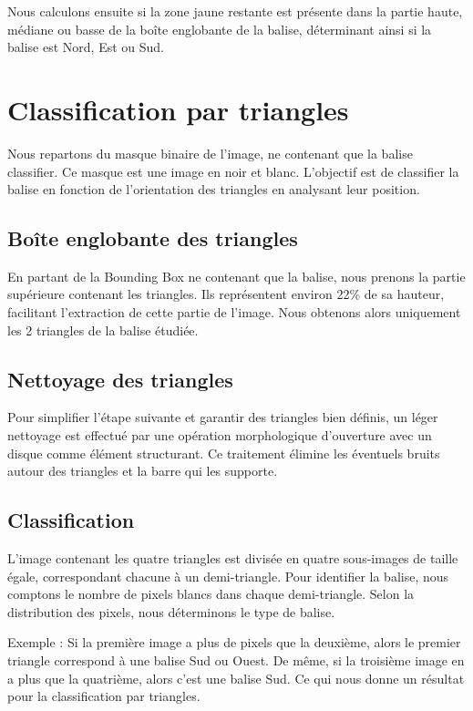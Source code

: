 \documentclass{article}
\begin{document}
Nous calculons ensuite si la zone jaune restante est présente dans la partie
haute, médiane ou basse de la boîte englobante de la balise, déterminant ainsi
si la balise est Nord, Est ou Sud.

\section{Classification par triangles}

Nous repartons du masque binaire de l’image, ne contenant que la balise
classifier. Ce masque est une image en noir et blanc. L’objectif est de
classifier la balise en fonction de l’orientation des triangles en analysant
leur position.

\subsection{Boîte englobante des triangles}

En partant de la Bounding Box ne contenant que la balise, nous prenons la
partie supérieure contenant les triangles. Ils représentent environ 22\% de sa
hauteur, facilitant l’extraction de cette partie de l’image. Nous obtenons
alors uniquement les 2 triangles de la balise étudiée.

\subsection{Nettoyage des triangles}

Pour simplifier l’étape suivante et garantir des triangles bien définis, un
léger nettoyage est effectué par une opération morphologique d’ouverture avec
un disque comme élément structurant. Ce traitement élimine les éventuels bruits
autour des triangles et la barre qui les supporte.

\subsection{Classification}

L’image contenant les quatre triangles est divisée en quatre sous-images de
taille égale, correspondant chacune à un demi-triangle. Pour identifier la
balise, nous comptons le nombre de pixels blancs dans chaque demi-triangle.
Selon la distribution des pixels, nous déterminons le type de balise.

Exemple : Si la première image a plus de pixels que la deuxième, alors le
premier triangle correspond à une balise Sud ou Ouest. De même, si la troisième
image en a plus que la quatrième, alors c’est une balise Sud. Ce qui nous donne
un résultat pour la classification par triangles.
\end{document}
